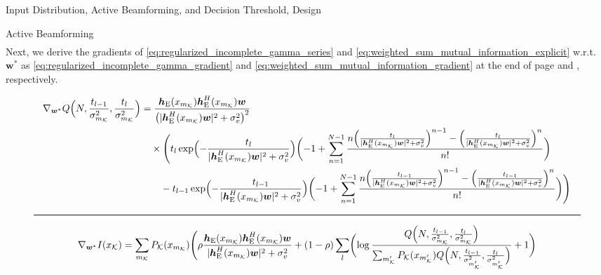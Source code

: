 \documentclass[journal]{IEEEtran}
\begin{document}
\begin{section}{Input Distribution, Active Beamforming, and Decision Threshold, Design}
\begin{subsection}{Active Beamforming}
\begin{align}
			\label{eq:regularized_incomplete_gamma_series}
		\end{align}
		Next, we derive the gradients of \eqref{eq:regularized_incomplete_gamma_series} and \eqref{eq:weighted_sum_mutual_information_explicit} w.r.t. $\boldsymbol{w}^*$ as \eqref{eq:regularized_incomplete_gamma_gradient} and \eqref{eq:weighted_sum_mutual_information_gradient} at the end of page \pageref{eq:regularized_incomplete_gamma_gradient} and \pageref{eq:weighted_sum_mutual_information_gradient}, respectively.
		\begin{figure}[!b]
			\begin{align}
				\nabla_{\boldsymbol{w}^*} Q\Bigl(N,\frac{t_{l-1}}{\sigma_{m_{\mathcal{K}}}^2},\frac{t_l}{\sigma_{m_{\mathcal{K}}}^2}\Bigr)
				 & = \frac{\boldsymbol{h}_{\mathrm{E}}(x_{m_{\mathcal{K}}})\boldsymbol{h}_{\mathrm{E}}^H(x_{m_{\mathcal{K}}})\boldsymbol{w}}{\bigl(\lvert\boldsymbol{h}_{\mathrm{E}}^H(x_{m_{\mathcal{K}}})\boldsymbol{w}\rvert^2+\sigma_v^2\bigr)^2}\nonumber                                                                                                                                                                                                        \\
				 & \quad \times \Biggl(t_l\exp\Bigl(-\frac{t_l}{\lvert\boldsymbol{h}_{\mathrm{E}}^H(x_{m_{\mathcal{K}}})\boldsymbol{w}\rvert^2+\sigma_v^2}\Bigr)\biggl(-1+\sum_{n=1}^{N-1} \frac{n\Bigl(\frac{t_l}{\lvert\boldsymbol{h}_{\mathrm{E}}^H(x_{m_{\mathcal{K}}})\boldsymbol{w}\rvert^2+\sigma_v^2}\Bigr)^{n-1}-\Bigl(\frac{t_l}{\lvert\boldsymbol{h}_{\mathrm{E}}^H(x_{m_{\mathcal{K}}})\boldsymbol{w}\rvert^2+\sigma_v^2}\Bigr)^n}{n!}\biggr)\nonumber    \\
				 & \qquad - t_{l-1}\exp\Bigl(-\frac{t_{l-1}}{\lvert\boldsymbol{h}_{\mathrm{E}}^H(x_{m_{\mathcal{K}}})\boldsymbol{w}\rvert^2+\sigma_v^2}\Bigr)\biggl(-1+\sum_{n=1}^{N-1} \frac{n\Bigl(\frac{t_{l-1}}{\lvert\boldsymbol{h}_{\mathrm{E}}^H(x_{m_{\mathcal{K}}})\boldsymbol{w}\rvert^2+\sigma_v^2}\Bigr)^{n-1}-\Bigl(\frac{t_{l-1}}{\lvert\boldsymbol{h}_{\mathrm{E}}^H(x_{m_{\mathcal{K}}})\boldsymbol{w}\rvert^2+\sigma_v^2}\Bigr)^n}{n!}\biggr)\Biggr)
				\label{eq:regularized_incomplete_gamma_gradient}
			\end{align}
		\end{figure}
		\begin{figure}[!b]
			\hrule
			\begin{align}
				\nabla_{\boldsymbol{w}^*} I(x_{\mathcal{K}})
				 & = \sum_{m_{\mathcal{K}}}P_{\mathcal{K}}(x_{m_{\mathcal{K}}})\Biggl(\rho\frac{\boldsymbol{h}_{\mathrm{E}}(x_{m_{\mathcal{K}}})\boldsymbol{h}_{\mathrm{E}}^H(x_{m_{\mathcal{K}}})\boldsymbol{w}}{\lvert\boldsymbol{h}_{\mathrm{E}}^H(x_{m_{\mathcal{K}}})\boldsymbol{w}\rvert^2+\sigma_v^2}+(1-\rho)\sum_l\biggl(\log\frac{Q\Bigl(N,\frac{t_{l-1}}{\sigma_{m_{\mathcal{K}}}^2},\frac{t_l}{\sigma_{m_{\mathcal{K}}}^2}\Bigr)}{\sum_{m_{\mathcal{K}}'}P_{\mathcal{K}}(x_{m_{\mathcal{K}}'})Q\Bigl(N,\frac{t_{l-1}}{\sigma_{m_{\mathcal{K}}'}^2},\frac{t_l}{\sigma_{m_{\mathcal{K}}'}^2}\Bigr)}+1\biggr)\nonumber   \\

\end{align}
\end{figure}
\end{subsection}
\end{section}
\end{document}
